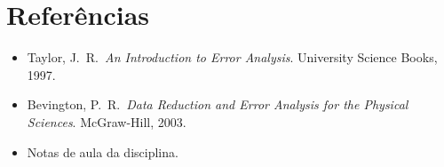 \documentclass[12pt,a4paper]{article}
\begin{document}
\section*{Refer\^encias}
\begin{itemize}
  \item Taylor, J.\ R.\ \textit{An Introduction to Error Analysis}. University Science Books, 1997.
  \item Bevington, P.\ R.\ \textit{Data Reduction and Error Analysis for the Physical Sciences}. McGraw-Hill, 2003.
  \item Notas de aula da disciplina.
\end{itemize}
\end{document}
